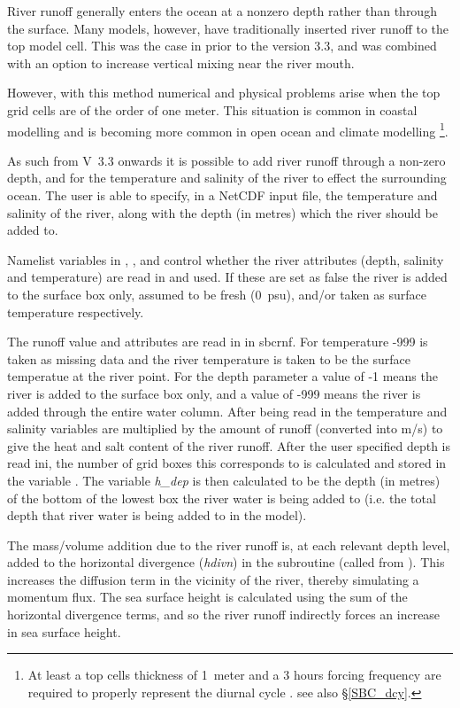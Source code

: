 River runoff generally enters the ocean at a nonzero depth rather than through the surface.
Many models, however, have traditionally inserted river runoff to the top model cell.
This was the case in \NEMO prior to the version 3.3, and was combined with an option 
to increase vertical mixing near the river mouth.

However, with this method numerical and physical problems arise when the top grid cells are 
of the order of one meter. This situation is common in coastal modelling and is becoming 
more common in open ocean and climate modelling 
\footnote{At least a top cells thickness of 1~meter and a 3 hours forcing frequency are
required to properly represent the diurnal cycle \citep{Bernie_al_JC05}. see also \S\ref{SBC_dcy}.}.

As such from V~3.3 onwards it is possible to add river runoff through a non-zero depth, and for the 
temperature and salinity of the river to effect the surrounding ocean.
The user is able to specify, in a NetCDF input file, the temperature and salinity of the river, along with the   
depth (in metres) which the river should be added to.

Namelist variables in , ,  and  control whether 
the river attributes (depth, salinity and temperature) are read in and used.  If these are set 
as false the river is added to the surface box only, assumed to be fresh (0~psu), and/or 
taken as surface temperature respectively.

The runoff value and attributes are read in in sbcrnf.  
For temperature -999 is taken as missing data and the river temperature is taken to be the 
surface temperatue at the river point.
For the depth parameter a value of -1 means the river is added to the surface box only, 
and a value of -999 means the river is added through the entire water column. 
After being read in the temperature and salinity variables are multiplied by the amount of runoff (converted into m/s) 
to give the heat and salt content of the river runoff.
After the user specified depth is read ini, the number of grid boxes this corresponds to is 
calculated and stored in the variable .
The variable \textit{h\_dep} is then calculated to be the depth (in metres) of the bottom of the 
lowest box the river water is being added to (i.e. the total depth that river water is being added to in the model).

The mass/volume addition due to the river runoff is, at each relevant depth level, added to the horizontal divergence 
(\textit{hdivn}) in the subroutine  (called from ).
This increases the diffusion term in the vicinity of the river, thereby simulating a momentum flux.
The sea surface height is calculated using the sum of the horizontal divergence terms, and so the 
river runoff indirectly forces an increase in sea surface height. 

